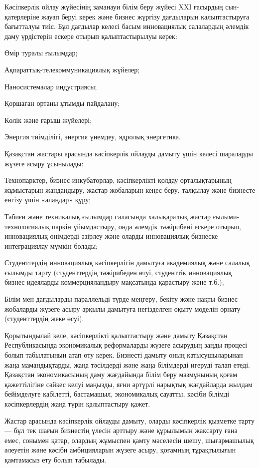 \begin{multicols}{2}
Кәсіпкерлік ойлау жүйесінің заманауи білім беру жүйесі XXI ғасырдың
сын-қатерлеріне жауап беруі керек және бизнес жүргізу дағдыларын
қалыптастыруға бағытталуы тиіс. Бұл дағдылар келесі басым инновациялық
салалардың әлемдік даму үрдістерін ескере отырып қалыптастырылуы керек:

Өмір туралы ғылымдар;

Ақпараттық-телекоммуникациялық жүйелер;

Наносистемалар индустриясы;

Қоршаған ортаны ұтымды пайдалану;

Көлік және ғарыш жүйелері;

Энергия тиімділігі, энергия үнемдеу, ядролық энергетика.

Қазақстан жастары арасында кәсіпкерлік ойлауды дамыту үшін келесі
шараларды жүзеге асыру ұсынылады:

Технопарктер, бизнес-инкубаторлар, кәсіпкерлікті қолдау орталықтарының
жұмыстарын жандандыру, жастар жобаларын кеңес беру, талқылау және
бизнесте енгізу үшін «алаңдар» құру;

Табиғи және техникалық ғылымдар саласында халықаралық жастар
ғылыми-технологиялық паркін ұйымдастыру, онда әлемдік тәжірибені ескере
отырып, инновациялық өнімдерді әзірлеу және оларды инновациялық бизнеске
интеграциялау мүмкін болады;

Студенттердің инновациялық кәсіпкерлігін дамытуға академиялық және
салалық ғылымды тарту (студенттердің тәжірибеден өтуі, студенттік
инновациялық бизнес-идеяларды коммерцияландыру мақсатында қарастыру және
т.б.);

Білім мен дағдыларды параллельді түрде меңгеру, бекіту және нақты бизнес
жобаларды жүзеге асыру арқылы дамытуға негізделген оқыту моделін орнату
(студенттердің жеке өсуі).

Қорытындылай келе, кәсіпкерлікті қалыптастыру және дамыту Қазақстан
Республикасында экономикалық реформаларды жүзеге асырудың заңды процесі
болып табылатынын атап өту керек. Бизнесті дамыту оның қатысушыларынан
жаңа мамандықтарды, жаңа тәсілдерді және жаңа білімдерді игеруді талап
етеді. Қазақстан экономикасының даму жағдайында білім беру мазмұнының
қоғам қажеттілігіне сәйкес келуі маңызды, яғни әртүрлі нарықтық
жағдайларда жылдам бейімделуге қабілетті, бастамашыл, экономикалық
сауатты, кәсіби білімді кәсіпкерлердің жаңа түрін қалыптастыру қажет.

Жастар арасында кәсіпкерлік ойлауды дамыту, оларды кәсіпкерлік қызметке
тарту --- бұл тек шағын бизнестің үлесін арттыру және құрылымын жақсарту
ғана емес, сонымен қатар, олардың жұмыспен қамту мәселесін шешу,
шығармашылық әлеуетін және кәсіби амбицияларын жүзеге асыру, қоғамның
тұрақтылығын қамтамасыз ету болып табылады.
\end{multicols}


